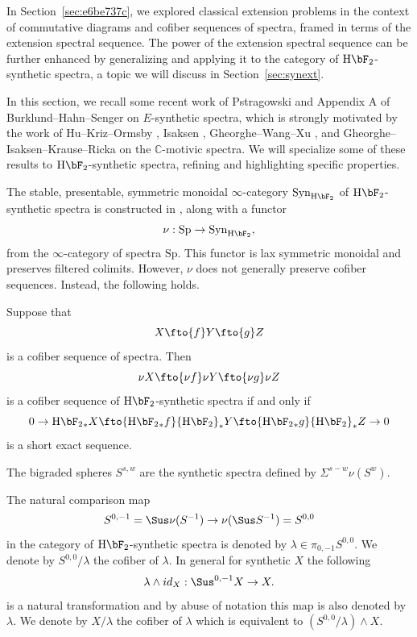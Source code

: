 \documentclass{amsart}
\numberwithin{equation}{section}
\newcommand{\HF}{\mathrm{H}\bF_2}
\begin{document}

In Section~\ref{sec:e6be737c}, we explored classical extension problems in the context of commutative diagrams and cofiber sequences of spectra, framed in terms of the extension spectral sequence. The power of the extension spectral sequence can be further enhanced by generalizing and applying it to the category of $\HF$-synthetic spectra, a topic we will discuss in Section~\ref{sec:synext}.

In this section, we recall some recent work of Pstragowski \cite{Pst} and Appendix A of Burklund--Hahn--Senger \cite{BHS} on $E$-synthetic spectra, which is strongly motivated by the work of Hu--Kriz--Ormsby \cite{HuKrizOrmsby}, Isaksen \cite{Isaksen}, Gheorghe--Wang--Xu \cite{GWX}, and Gheorghe--Isaksen--Krause--Ricka \cite{GIKR} on the $\mathbb{C}$-motivic spectra. We will specialize some of these results to $\HF$-synthetic spectra, refining and highlighting specific properties.

The stable, presentable, symmetric monoidal $\infty$-category $\mathrm{Syn}_{\HF}$ of $\HF$-synthetic spectra is constructed in \cite{Pst}, along with a functor
$$\nu: \mathrm{Sp}\to \mathrm{Syn}_{\HF},$$
from the $\infty$-category of spectra $\mathrm{Sp}$. This functor is lax symmetric monoidal and preserves filtered colimits. However, $\nu$ does not generally preserve cofiber sequences. Instead, the following holds.

\begin{proposition}\label{prop:1f7950df}
    Suppose that
    $$X\fto{f} Y\fto{g} Z$$
    is a cofiber sequence of spectra. Then
    $$\nu X\fto{\nu f}\nu Y\fto{\nu g} \nu Z$$
    is a cofiber sequence of ${\HF}$-synthetic spectra if and only if
    $$0\to {\HF}_*X\fto{{\HF}_*f} {\HF}_*Y\fto{{\HF}_*g} {\HF}_*Z\to 0$$
    is a short exact sequence.
\end{proposition}


\begin{definition}
The bigraded spheres $S^{s,w}$ are the synthetic spectra defined by $\Sigma^{s-w}\nu (S^w)$.
\end{definition}

\begin{definition}
    The natural comparison map
    $$S^{0,-1}=\Sus \nu (S^{-1})\to \nu(\Sus S^{-1})=S^{0,0}$$
    in the category of $\HF$-synthetic spectra is denoted by $\lambda\in \pi_{0,-1}S^{0,0}$. We denote by $S^{0,0}/\lambda$ the cofiber of $\lambda$. In general for synthetic $X$ the following
    $$\lambda\wedge id_X: \Sus^{0,-1}X\to X.$$
    is a natural transformation and by abuse of notation this map is also denoted by $\lambda$.
    We denote by $X/\lambda$ the cofiber of $\lambda$
    which is equivalent to $(S^{0,0}/\lambda) \wedge X$.
\end{definition}
\end{document}
